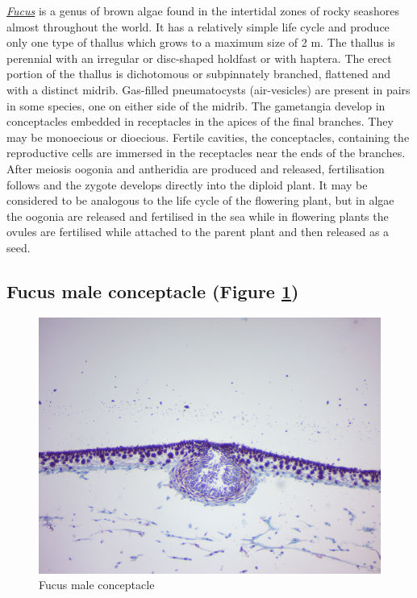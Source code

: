 \href{https://en.wikipedia.org/wiki/Fucus}{\emph{Fucus}} is a genus of
brown algae found in the intertidal zones of rocky seashores almost
throughout the world. It has a relatively simple life cycle and produce
only one type of thallus which grows to a maximum size of 2 m. The
thallus is perennial with an irregular or disc-shaped holdfast or with
haptera. The erect portion of the thallus is dichotomous or subpinnately
branched, flattened and with a distinct midrib. Gas-filled pneumatocysts
(air-vesicles) are present in pairs in some species, one on either side
of the midrib. The gametangia develop in conceptacles embedded in
receptacles in the apices of the final branches. They may be monoecious
or dioecious. Fertile cavities, the conceptacles, containing the
reproductive cells are immersed in the receptacles near the ends of the
branches. After meiosis oogonia and antheridia are produced and
released, fertilisation follows and the zygote develops directly into
the diploid plant. It may be considered to be analogous to the life
cycle of the flowering plant, but in algae the oogonia are released and
fertilised in the sea while in flowering plants the ovules are
fertilised while attached to the parent plant and then released as a
seed.

\subsection{Fucus male conceptacle (Figure
\ref{fig:malefucus})}\label{fucus-male-conceptacle-figure-reffigmalefucus}

\begin{figure}

{\centering \includegraphics[width=0.7\linewidth]{./figures/protists/male_fucus}

}

\caption{Fucus male conceptacle}\label{fig:malefucus}
\end{figure}

